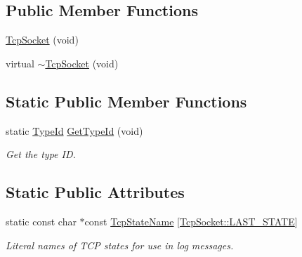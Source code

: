 \subsection*{Public Member Functions}
\begin{DoxyCompactItemize}
\item 
\hyperlink{classns3_1_1TcpSocket_a70c351707b7af59abb6912cd7d145e60}{Tcp\+Socket} (void)
\item 
virtual \hyperlink{classns3_1_1TcpSocket_a128cfde99619e361e1022488439ebe97}{$\sim$\+Tcp\+Socket} (void)
\end{DoxyCompactItemize}
\subsection*{Static Public Member Functions}
\begin{DoxyCompactItemize}
\item 
static \hyperlink{classns3_1_1TypeId}{Type\+Id} \hyperlink{classns3_1_1TcpSocket_a3026dbda3dca84c3ec04d6776c86247a}{Get\+Type\+Id} (void)
\begin{DoxyCompactList}\small\item\em Get the type ID. \end{DoxyCompactList}\end{DoxyCompactItemize}
\subsection*{Static Public Attributes}
\begin{DoxyCompactItemize}
\item 
static const char $\ast$const \hyperlink{classns3_1_1TcpSocket_a1706f3309652d17f052b7d05816dd5ba}{Tcp\+State\+Name} \mbox{[}\hyperlink{group__tcp_gga3929cdb47bdf159657fa24054aa5ca03a684440ec60e09c0ae73fc3758acaae4e}{Tcp\+Socket\+::\+L\+A\+S\+T\+\_\+\+S\+T\+A\+TE}\mbox{]}
\begin{DoxyCompactList}\small\item\em Literal names of T\+CP states for use in log messages. \end{DoxyCompactList}\end{DoxyCompactItemize}
